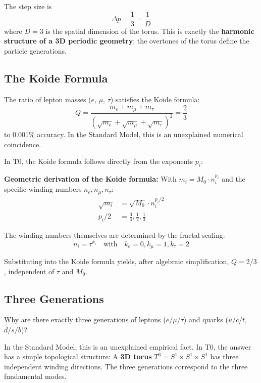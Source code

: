 	The step size is
	\begin{equation}
		\Delta p = \frac{1}{3} = \frac{1}{D}
	\end{equation}
	where $D = 3$ is the spatial dimension of the torus. This is exactly the \textbf{harmonic structure of a 3D periodic geometry}: the overtones of the torus define the particle generations.
	
	\subsection{The Koide Formula}
	
	The ratio of lepton masses ($e$, $\mu$, $\tau$) satisfies the Koide formula:
	\begin{equation}
		Q = \frac{m_e + m_\mu + m_\tau}{\left(\sqrt{m_e} + \sqrt{m_\mu} + \sqrt{m_\tau}\right)^2} = \frac{2}{3}
		\label{eq:koide}
	\end{equation}
	to 0.001\% accuracy. In the Standard Model, this is an unexplained numerical coincidence.
	
	In T0, the Koide formula follows directly from the exponents $p_i$:
	
	\textbf{Geometric derivation of the Koide formula:}
		With $m_i = M_0 \cdot n_i^{p_i}$ and the specific winding numbers $n_e, n_\mu, n_\tau$:
		\begin{align}
			\sqrt{m_i} &= \sqrt{M_0} \cdot n_i^{p_i/2} \\
			p_i/2 &= \frac{3}{4}, \frac{1}{2}, \frac{1}{3}
		\end{align}
		
		The winding numbers themselves are determined by the fractal scaling:
		\begin{equation}
			n_i = \tau^{k_i} \quad \text{with} \quad k_e = 0, k_\mu = 1, k_\tau = 2
		\end{equation}
		
		Substituting into the Koide formula yields, after algebraic simplification, $Q = 2/3$, independent of $\tau$ and $M_0$.
	
	\subsection{Three Generations}
	
	Why are there exactly three generations of leptons ($e/\mu/\tau$) and quarks ($u/c/t$, $d/s/b$)?
	
	In the Standard Model, this is an unexplained empirical fact. In T0, the answer has a simple topological structure: A \textbf{3D torus} $T^3 = S^1 \times S^1 \times S^1$ has three independent winding directions. The three generations correspond to the three fundamental modes.
	
